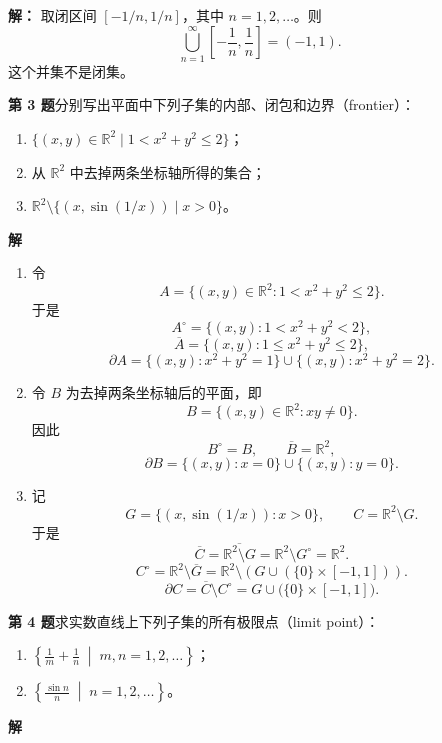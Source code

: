 \documentclass[UTF8,a4paper,11pt,fontset=windows]{ctexart}
\newcommand{\R}{\mathbb R}
\newcommand{\problem}[1]{\par\addvspace{10pt}\textbf{第 #1 题}\quad}
\begin{document}
\textbf{解：} 取闭区间 $[-1/n,1/n]$，其中 $n=1,2,\ldots$。则
\[
  \bigcup_{n=1}^\infty\left[-\frac{1}{n},\frac{1}{n}\right]=(−1,1).
\]
这个并集不是闭集。

\problem{3}分别写出平面中下列子集的内部、闭包和边界（frontier）：
\begin{enumerate}
  \item $\{(x,y)\in\mathbb R^2\mid 1<x^2+y^2\leq 2\}$；
  \item 从 $\mathbb R^2$ 中去掉两条坐标轴所得的集合；
  \item $\mathbb R^2\setminus\{(x,\sin(1/x))\mid x>0\}$。
\end{enumerate}

\textbf{解}
\begin{enumerate}
  \item 令
  \[
    A=\{(x,y)\in\R^2:1<x^2+y^2\leq2\}.
  \]
 于是
  \[
    A^\circ=\{(x,y):1<x^2+y^2<2\},
  \]
  \[
    \overline A=\{(x,y):1\leq x^2+y^2\leq2\},
  \]
  \[
    \partial A=\{(x,y):x^2+y^2=1\}\cup
    \{(x,y):x^2+y^2=2\}.
  \]

  \item 令 $B$ 为去掉两条坐标轴后的平面，即
  \[
    B=\{(x,y)\in\R^2:xy\neq0\}.
  \]
 因此
  \[
    B^\circ=B,\qquad \overline B=\R^2,
  \]
  \[
    \partial B=\{(x,y):x=0\}\cup\{(x,y):y=0\}.
  \]

  \item 记
  \[
    G=\{(x,\sin(1/x)):x>0\},\qquad C=\R^2\setminus G.
  \]
于是
  \[
    \overline C=\overline{\R^2\setminus G}
    =\R^2\setminus G^\circ=\R^2.
  \]
  \[
    C^\circ=\R^2\setminus\overline G
    =\R^2\setminus\left(G\cup(\{0\}\times[-1,1])\right).
  \]
  \[
    \partial C=\overline C\setminus C^\circ
    =G\cup\bigl(\{0\}\times[-1,1]\bigr).
  \]
\end{enumerate}

\problem{4}求实数直线上下列子集的所有极限点（limit point）：
\begin{enumerate}
  \item $\displaystyle\left\{\frac1m+\frac1n\;\middle|\;m,n=1,2,\ldots\right\}$；
  \item $\displaystyle\left\{\frac{\sin n}{n}\;\middle|\;n=1,2,\ldots\right\}$。
\end{enumerate}

\textbf{解}
\end{document}
